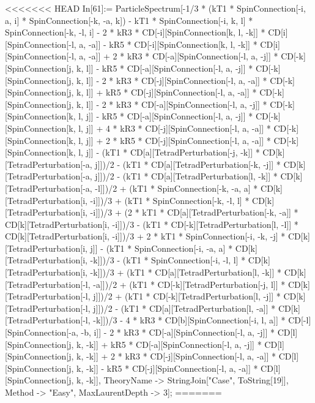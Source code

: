 <<<<<<< HEAD
In[61]:= ParticleSpectrum[-1/3 * (kT1 * SpinConnection[-i, a, i] * SpinConnection[-k, -a, k]) - kT1 * SpinConnection[-i, k, l] * SpinConnection[-k, -l, i] - 2 * kR3 * CD[-i][SpinConnection[k, l, -k]] * CD[i][SpinConnection[-l, a, -a]] - kR5 * CD[-i][SpinConnection[k, l, -k]] * CD[i][SpinConnection[-l, a, -a]] + 2 * kR3 * CD[-a][SpinConnection[-l, a, -j]] * CD[-k][SpinConnection[j, k, l]] - kR5 * CD[-a][SpinConnection[-l, a, -j]] * CD[-k][SpinConnection[j, k, l]] - 2 * kR3 * CD[-j][SpinConnection[-l, a, -a]] * CD[-k][SpinConnection[j, k, l]] + kR5 * CD[-j][SpinConnection[-l, a, -a]] * CD[-k][SpinConnection[j, k, l]] - 2 * kR3 * CD[-a][SpinConnection[-l, a, -j]] * CD[-k][SpinConnection[k, l, j]] - kR5 * CD[-a][SpinConnection[-l, a, -j]] * CD[-k][SpinConnection[k, l, j]] + 4 * kR3 * CD[-j][SpinConnection[-l, a, -a]] * CD[-k][SpinConnection[k, l, j]] + 2 * kR5 * CD[-j][SpinConnection[-l, a, -a]] * CD[-k][SpinConnection[k, l, j]] - (kT1 * CD[a][TetradPerturbation[-j, -k]] * CD[k][TetradPerturbation[-a, j]])/2 - (kT1 * CD[a][TetradPerturbation[-k, -j]] * CD[k][TetradPerturbation[-a, j]])/2 - (kT1 * CD[a][TetradPerturbation[l, -k]] * CD[k][TetradPerturbation[-a, -l]])/2 + (kT1 * SpinConnection[-k, -a, a] * CD[k][TetradPerturbation[i, -i]])/3 + (kT1 * SpinConnection[-k, -l, l] * CD[k][TetradPerturbation[i, -i]])/3 + (2 * kT1 * CD[a][TetradPerturbation[-k, -a]] * CD[k][TetradPerturbation[i, -i]])/3 - (kT1 * CD[-k][TetradPerturbation[l, -l]] * CD[k][TetradPerturbation[i, -i]])/3 + 2 * kT1 * SpinConnection[-i, -k, -j] * CD[k][TetradPerturbation[i, j]] - (kT1 * SpinConnection[-i, -a, a] * CD[k][TetradPerturbation[i, -k]])/3 - (kT1 * SpinConnection[-i, -l, l] * CD[k][TetradPerturbation[i, -k]])/3 + (kT1 * CD[a][TetradPerturbation[l, -k]] * CD[k][TetradPerturbation[-l, -a]])/2 + (kT1 * CD[-k][TetradPerturbation[-j, l]] * CD[k][TetradPerturbation[-l, j]])/2 + (kT1 * CD[-k][TetradPerturbation[l, -j]] * CD[k][TetradPerturbation[-l, j]])/2 - (kT1 * CD[a][TetradPerturbation[l, -a]] * CD[k][TetradPerturbation[-l, -k]])/3 - 4 * kR3 * CD[b][SpinConnection[-i, l, a]] * CD[-l][SpinConnection[-a, -b, i]] - 2 * kR3 * CD[-a][SpinConnection[-l, a, -j]] * CD[l][SpinConnection[j, k, -k]] + kR5 * CD[-a][SpinConnection[-l, a, -j]] * CD[l][SpinConnection[j, k, -k]] + 2 * kR3 * CD[-j][SpinConnection[-l, a, -a]] * CD[l][SpinConnection[j, k, -k]] - kR5 * CD[-j][SpinConnection[-l, a, -a]] * CD[l][SpinConnection[j, k, -k]], TheoryName -> StringJoin["Case", ToString[19]], Method -> "Easy", MaxLaurentDepth -> 3]; 
=======
